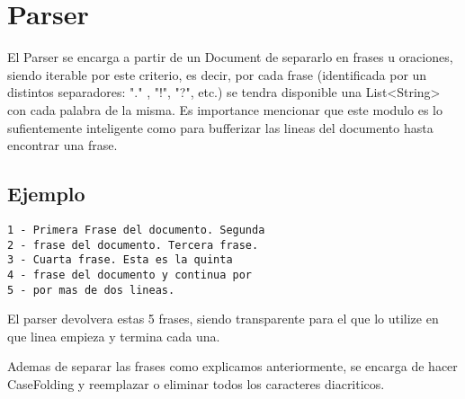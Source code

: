 \section{Parser}
El Parser se encarga a partir de un Document de separarlo en frases u oraciones, siendo iterable por este criterio, es decir, por cada frase (identificada por un distintos separadores: "." , "!", "?", etc.) se tendra disponible una List<String> con cada palabra de la misma. Es importance mencionar que este modulo es lo sufientemente inteligente como para bufferizar las lineas del documento hasta encontrar una frase. 

\subsection{Ejemplo}

\begin{verbatim}
1 - Primera Frase del documento. Segunda
2 - frase del documento. Tercera frase.
3 - Cuarta frase. Esta es la quinta
4 - frase del documento y continua por
5 - por mas de dos lineas.
\end{verbatim}

El parser devolvera estas 5 frases, siendo transparente para el que lo utilize en que linea empieza y termina cada una.

Ademas de separar las frases como explicamos anteriormente, se encarga de hacer CaseFolding y reemplazar o eliminar todos los caracteres diacriticos.
